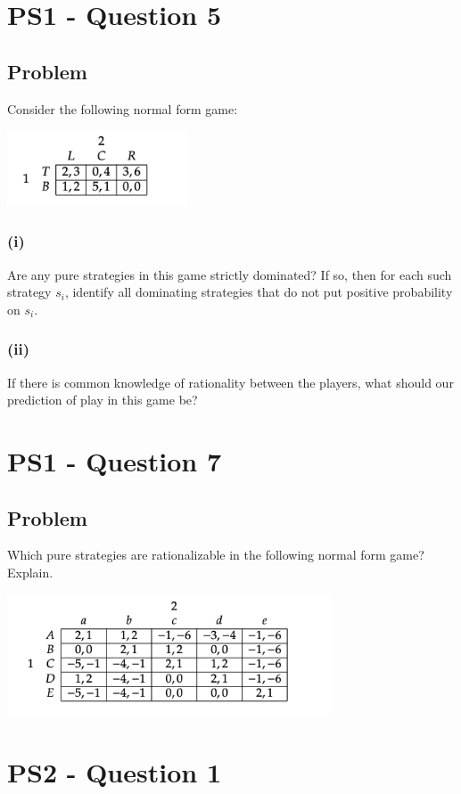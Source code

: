 \documentclass[10pt, a4paper]{article}
\begin{document}
\section*{PS1 - Question 5}
  \subsection*{Problem}
    Consider the following normal form game:
    \begin{center}
      \includegraphics[width = 0.4\textwidth]{PS1-5.png}
    \end{center}
    \subsubsection*{(i)}
      Are any pure strategies in this game strictly dominated? If so, then for each such strategy $s_i$, identify all dominating strategies that do not put positive probability on $s_i$.
    \subsubsection*{(ii)}
      If there is common knowledge of rationality between the players, what should our prediction of play in this game be?
\section*{PS1 - Question 7}
  \subsection*{Problem}
    Which pure strategies are rationalizable in the following normal form game? Explain.
    \begin{center}
      \includegraphics[width = 0.72\textwidth]{PS1-7.png}
    \end{center}
\section*{PS2 - Question 1}
\end{document}
